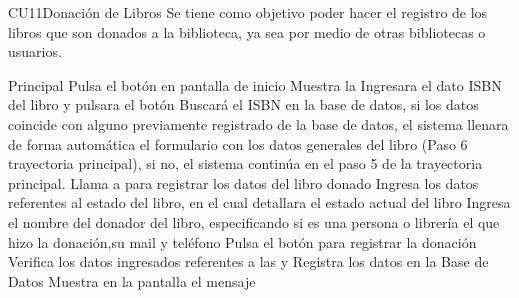 	\begin{UseCase}{CU11}{Donación de Libros}{
		Se tiene como objetivo poder hacer el registro de los libros que son donados a la biblioteca, ya sea por medio de otras bibliotecas o usuarios.
}
	\end{UseCase}

	\begin{UCtrayectoria}{Principal}
		\UCpaso [\UCactor]Pulsa el botón  en pantalla de inicio
		\UCpaso Muestra la 
		\UCpaso [\UCactor] Ingresara el dato ISBN del libro y pulsara el botón  
		\UCpaso Buscará el ISBN en la base de datos, si los datos coincide con alguno previamente registrado de la base de datos, el sistema llenara de forma automática el formulario con los datos generales del libro (Paso 6 trayectoria principal), si no, el sistema continúa en el paso 5 de la trayectoria principal.
		\UCpaso [\UCactor] Llama a  para registrar los datos del libro donado
		\UCpaso [\UCactor] Ingresa los datos referentes al estado del libro, en el cual detallara el estado actual del libro
		\UCpaso [\UCactor] Ingresa el nombre del donador del libro, especificando si es una persona o librería el que hizo la donación,su mail y teléfono 
		\UCpaso [\UCactor] Pulsa el botón  para registrar la donación 
		\UCpaso Verifica los datos ingresados referentes a las  y   
		\UCpaso Registra los datos en la Base de Datos  
		\UCpaso Muestra en la pantalla el mensaje 
	\end{UCtrayectoria}
		
